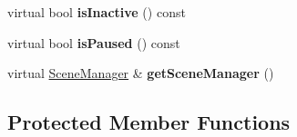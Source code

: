 \begin{DoxyCompactItemize}
\item 
\mbox{\label{classzt_1_1_scene_a9ae2b530af478e2444e06c1994531f87}} 
virtual bool {\bfseries is\+Inactive} () const
\item 
\mbox{\label{classzt_1_1_scene_af2de671d8fa2ef003c0cd55440482464}} 
virtual bool {\bfseries is\+Paused} () const
\item 
\mbox{\label{classzt_1_1_scene_a7bfc8a6811275f47b858b9baa55ac106}} 
virtual \hyperlink{classzt_1_1_scene_manager}{Scene\+Manager} \& {\bfseries get\+Scene\+Manager} ()
\end{DoxyCompactItemize}
\subsection*{Protected Member Functions}
